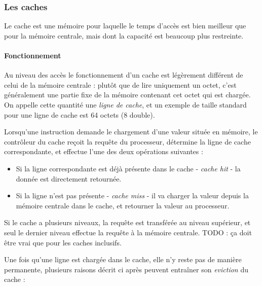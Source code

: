 \subsubsection{Les caches}
Le cache est une mémoire pour laquelle le temps d'accès est bien meilleur que pour la mémoire centrale, mais dont la capacité est beaucoup plus restreinte.

\paragraph{Fonctionnement}

Au niveau des accès le fonctionnement d'un cache est légèrement différent de celui de la mémoire centrale : plutôt que de lire uniquement un octet, c'est généralement une partie fixe de la mémoire contenant cet octet qui est chargée.
On appelle cette quantité une \emph{ligne de cache}, et un exemple de taille standard pour une ligne de cache est 64 octets (8 double).

Lorsqu'une instruction demande le chargement d'une valeur située en mémoire, le contrôleur du cache reçoit la requête du processeur, détermine la ligne de cache correspondante, et effectue l'une des deux opérations suivantes :
\begin{itemize}
    \item Si la ligne correspondante est déjà présente dans le cache - \emph{cache hit} - la donnée est directement retournée.
    \item Si la ligne n'est pas présente - \emph{cache miss} - il va charger la valeur depuis la mémoire centrale dans le cache, et retourner la valeur au processeur.
\end{itemize}

Si le cache a plusieurs niveaux, la requête est transférée au niveau supérieur, et seul le dernier niveau effectue la requête à la mémoire centrale. TODO : ça doit être vrai que pour les caches inclusifs.

Une fois qu'une ligne est chargée dans le cache, elle n'y reste pas de manière permanente, plusieurs raisons décrit ci après peuvent entraîner son \emph{eviction} du cache :

